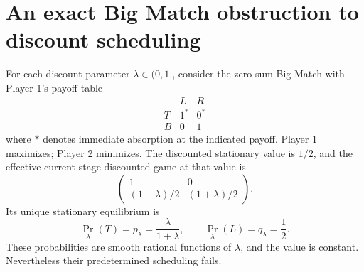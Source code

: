\documentclass[11pt,a4paper]{article}
\theoremstyle{definition}
\theoremstyle{remark}
\begin{document}
\section{An exact Big Match obstruction to discount scheduling}\label{sec:bigmatch}
For each discount parameter $\lambda\in(0,1]$, consider the zero-sum Big Match with Player 1's payoff table
\[
\begin{array}{c|cc}
 &L&R\\\hline
T&1^*&0^*\\
B&0&1
\end{array}
\]
where $*$ denotes immediate absorption at the indicated payoff. Player 1 maximizes; Player 2 minimizes. The discounted stationary value is $1/2$, and the effective current-stage discounted game at that value is
\[
\begin{pmatrix}1&0\\(1-\lambda)/2&(1+\lambda)/2\end{pmatrix}.
\]
Its unique stationary equilibrium is
\begin{equation}\label{eq:discount-actions}
\Pr_\lambda(T)=p_\lambda=\frac{\lambda}{1+\lambda},
\qquad\Pr_\lambda(L)=q_\lambda=\frac12.
\end{equation}
These probabilities are smooth rational functions of $\lambda$, and the value is constant. Nevertheless their predetermined scheduling fails.
\end{document}
